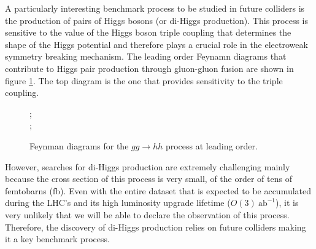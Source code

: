 A particularly interesting benchmark process to be studied in future colliders is the production of pairs of Higgs bosons (or di-Higgs production). This process is sensitive to the value of the Higgs boson triple coupling that determines the shape of the Higgs potential and therefore plays a crucial role in the electroweak symmetry breaking mechanism. The leading order Feynamn diagrams that contribute to Higgs pair production through gluon-gluon fusion are shown in figure \ref{fig:hh_diag}. The top diagram is the one that provides sensitivity to the triple coupling.

\begin{figure}[h]
	\centering
	;\\
	;
	\label{fig:hh_diag}
	\caption{Feynman diagrams for the $gg\rightarrow hh$ process at leading order.}
\end{figure}

However, searches for di-Higgs production are extremely challenging mainly because the cross section of this process is very small, of the order of tens of femtobarns (fb). Even with the entire dataset that is expected to be accumulated during the LHC's and its high luminosity upgrade lifetime ($O(3)~\text{ab}^{-1}$), it is very unlikely that we will be able to declare the observation of this process. Therefore, the discovery of di-Higgs production relies on future colliders making it a key benchmark process.

